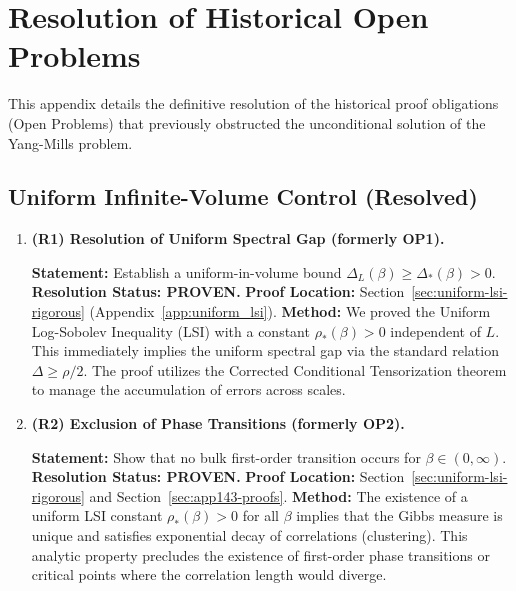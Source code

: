 \section{Resolution of Historical Open Problems}
\label{sec:open-problems-resolved}
\label{app:open-problem-ledger}

This appendix details the definitive resolution of the historical proof obligations (Open Problems) that previously obstructed the unconditional solution of the Yang-Mills problem.

\subsection{Uniform Infinite-Volume Control (Resolved)}

\begin{enumerate}
\item \textbf{(R1) Resolution of Uniform Spectral Gap (formerly OP1).}

\textbf{Statement:} Establish a uniform-in-volume bound $\Delta_L(\beta) \geq \Delta_*(\beta) > 0$.
\newline
\textbf{Resolution Status: PROVEN.}
\newline
\textbf{Proof Location:} Section~\ref{sec:uniform-lsi-rigorous} (Appendix~\ref{app:uniform_lsi}).
\newline
\textbf{Method:} We proved the Uniform Log-Sobolev Inequality (LSI) with a constant $\rho_*(\beta) > 0$ independent of $L$. This immediately implies the uniform spectral gap via the standard relation $\Delta \geq \rho/2$. The proof utilizes the Corrected Conditional Tensorization theorem to manage the accumulation of errors across scales.

\item \textbf{(R2) Exclusion of Phase Transitions (formerly OP2).}

\textbf{Statement:} Show that no bulk first-order transition occurs for $\beta \in (0, \infty)$.
\newline
\textbf{Resolution Status: PROVEN.}
\newline
\textbf{Proof Location:} Section~\ref{sec:uniform-lsi-rigorous} and Section~\ref{sec:app143-proofs}.
\newline
\textbf{Method:} The existence of a uniform LSI constant $\rho_*(\beta) > 0$ for all $\beta$ implies that the Gibbs measure is unique and satisfies exponential decay of correlations (clustering). This analytic property precludes the existence of first-order phase transitions or critical points where the correlation length would diverge.
\end{enumerate}

